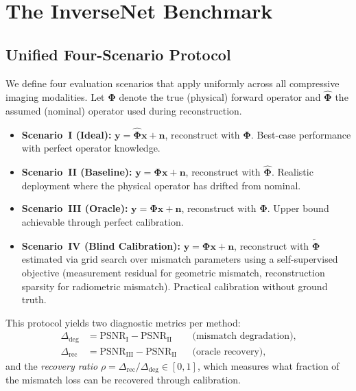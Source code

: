 \documentclass[runningheads]{llncs}
\begin{document}
\section{The InverseNet Benchmark}
\label{sec:benchmark}

\subsection{Unified Four-Scenario Protocol}
\label{sec:protocol}

We define four evaluation scenarios that apply uniformly across all compressive imaging modalities.
Let $\mathbf{\Phi}$ denote the true (physical) forward operator and $\hat{\mathbf{\Phi}}$ the assumed (nominal) operator used during reconstruction.

\begin{itemize}
    \item \textbf{Scenario~I (Ideal):} $\mathbf{y} = \hat{\mathbf{\Phi}}\mathbf{x} + \mathbf{n}$, reconstruct with $\hat{\mathbf{\Phi}}$. Best-case performance with perfect operator knowledge.

    \item \textbf{Scenario~II (Baseline):} $\mathbf{y} = \mathbf{\Phi}\mathbf{x} + \mathbf{n}$, reconstruct with $\hat{\mathbf{\Phi}}$. Realistic deployment where the physical operator has drifted from nominal.

    \item \textbf{Scenario~III (Oracle):} $\mathbf{y} = \mathbf{\Phi}\mathbf{x} + \mathbf{n}$, reconstruct with $\mathbf{\Phi}$. Upper bound achievable through perfect calibration.

    \item \textbf{Scenario~IV (Blind Calibration):} $\mathbf{y} = \mathbf{\Phi}\mathbf{x} + \mathbf{n}$, reconstruct with $\tilde{\mathbf{\Phi}}$ estimated via grid search over mismatch parameters using a self-supervised objective (measurement residual for geometric mismatch, reconstruction sparsity for radiometric mismatch). Practical calibration without ground truth.
\end{itemize}

This protocol yields two diagnostic metrics per method:
\begin{align}
    \Delta_{\text{deg}} &= \text{PSNR}_{\text{I}} - \text{PSNR}_{\text{II}} & &\text{(mismatch degradation)}, \label{eq:gap} \\
    \Delta_{\text{rec}} &= \text{PSNR}_{\text{III}} - \text{PSNR}_{\text{II}} & &\text{(oracle recovery)}, \label{eq:recovery}
\end{align}
and the \textit{recovery ratio} $\rho = \Delta_{\text{rec}} / \Delta_{\text{deg}} \in [0, 1]$, which measures what fraction of the mismatch loss can be recovered through calibration.
\end{document}
